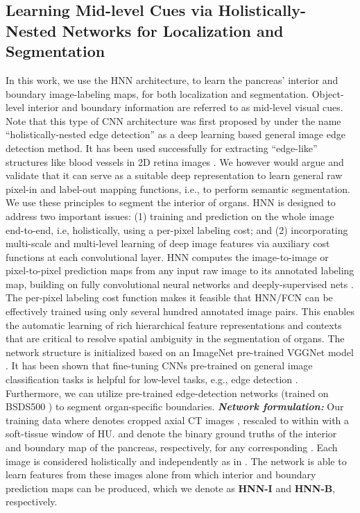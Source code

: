 \documentclass[journal]{IEEEtran}
\begin{document}
\subsection{Learning Mid-level Cues via Holistically-Nested Networks for Localization and Segmentation} \label{sec:segHNN} 
\noindent In this work, we use the HNN architecture, to learn the pancreas' interior and boundary image-labeling maps, for both localization and segmentation. Object-level interior and boundary information are referred to as mid-level visual cues. Note that this type of CNN architecture was first proposed by \cite{xie2015holistically} under the name ``holistically-nested edge detection'' as a deep learning based general image edge detection method. It has been used successfully for extracting ``edge-like'' structures like blood vessels in 2D retina images \cite{fu2016retinal}. We however would argue and validate that it can serve as a suitable deep representation to learn general raw pixel-in and label-out mapping functions, i.e., to perform semantic segmentation. We use these principles to segment the interior of organs. 
HNN is designed to address two important issues: (1) training and prediction on the whole image end-to-end, i.e, holistically, using a per-pixel labeling cost; and (2) incorporating multi-scale and multi-level learning of deep image features \cite{xie2015holistically} via auxiliary cost functions at each convolutional layer. HNN computes the image-to-image or pixel-to-pixel prediction maps from any input raw image to its annotated labeling map, building on fully convolutional neural networks \cite{long2015fully} and deeply-supervised nets \cite{lee2014deeply}. The per-pixel labeling cost function \cite{long2015fully,xie2015holistically} makes it feasible that HNN/FCN can be effectively trained using only several hundred annotated image pairs. This enables the automatic learning of rich hierarchical feature representations and contexts that are critical to resolve spatial ambiguity in the segmentation of organs. The network structure is initialized based on an ImageNet pre-trained VGGNet model \cite{simonyan2014very}. It has been shown that fine-tuning CNNs pre-trained on general image classification tasks is helpful for low-level tasks, e.g., edge detection \cite{xie2015holistically}. Furthermore, we can utilize pre-trained edge-detection networks (trained on BSDS500 \cite{xie2015holistically}) to segment organ-specific boundaries.
\textbf{\textit{Network formulation:}} Our training data  where  denotes cropped axial CT images , rescaled to within  with a soft-tissue window of  HU.  and  denote the binary ground truths of the interior and boundary map of the pancreas, respectively, for any corresponding . Each image is considered holistically and independently as in \cite{xie2015holistically}. The network is able to learn features from these images alone from which interior  and boundary prediction maps can be produced, which we denote as \textbf{HNN-I} and \textbf{HNN-B}, respectively.
\end{document}
